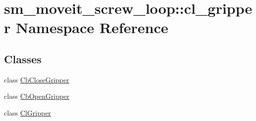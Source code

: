 \hypertarget{namespacesm__moveit__screw__loop_1_1cl__gripper}{}\section{sm\+\_\+moveit\+\_\+screw\+\_\+loop\+:\+:cl\+\_\+gripper Namespace Reference}
\label{namespacesm__moveit__screw__loop_1_1cl__gripper}
\subsection*{Classes}
\begin{DoxyCompactItemize}
\item 
class \hyperlink{classsm__moveit__screw__loop_1_1cl__gripper_1_1CbCloseGripper}{Cb\+Close\+Gripper}
\item 
class \hyperlink{classsm__moveit__screw__loop_1_1cl__gripper_1_1CbOpenGripper}{Cb\+Open\+Gripper}
\item 
class \hyperlink{classsm__moveit__screw__loop_1_1cl__gripper_1_1ClGripper}{Cl\+Gripper}
\end{DoxyCompactItemize}
